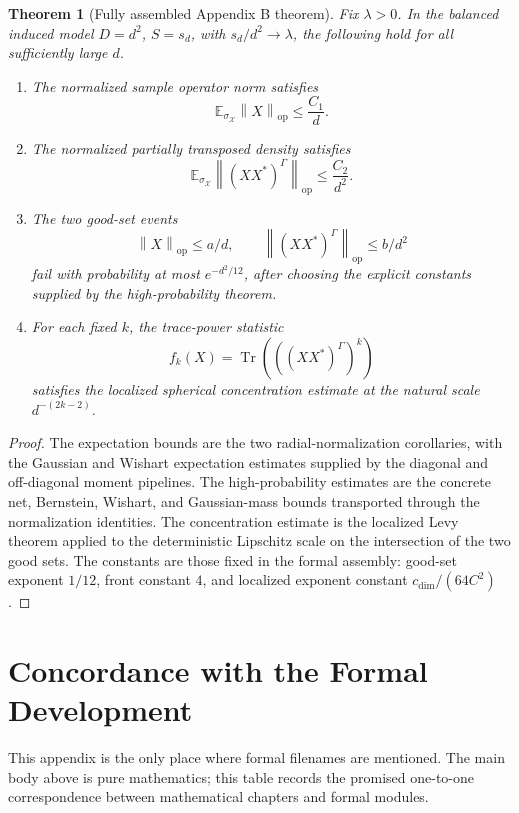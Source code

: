 \documentclass[11pt,oneside]{book}
\newtheorem{theorem}{Theorem}[chapter]
\DeclareMathOperator{\Tr}{Tr}
\newcommand{\E}{\mathbb E}
\newcommand{\1}{\mathbf 1}
\newcommand{\pt}{\Gamma}
\newcommand{\op}{\mathrm{op}}
\newcommand{\norm}[1]{\left\|#1\right\|}
\begin{document}
\begin{theorem}[Fully assembled Appendix B theorem]
Fix \(\lambda>0\).  In the balanced induced model \(D=d^2\), \(S=s_d\), with
\(s_d/d^2\to\lambda\), the following hold for all sufficiently large \(d\).
\begin{enumerate}[label=(\roman*)]
  \item The normalized sample operator norm satisfies
  \[
    \E_{\sigma_{\mathcal X}}\norm X_{\op}\le \frac{C_1}{d}.
  \]
  \item The normalized partially transposed density satisfies
  \[
    \E_{\sigma_{\mathcal X}}\norm{(XX^*)^\pt}_{\op}\le \frac{C_2}{d^2}.
  \]
  \item The two good-set events
  \[
    \norm X_{\op}\le a/d,\qquad
    \norm{(XX^*)^\pt}_{\op}\le b/d^2
  \]
  fail with probability at most \(e^{-d^2/12}\), after choosing the explicit
  constants supplied by the high-probability theorem.
  \item For each fixed \(k\), the trace-power statistic
  \[
    f_k(X)=\Tr\left(\left((XX^*)^\pt\right)^k\right)
  \]
  satisfies the localized spherical concentration estimate at the natural
  scale \(d^{-(2k-2)}\).
\end{enumerate}
\end{theorem}

\begin{proof}
The expectation bounds are the two radial-normalization corollaries, with the
Gaussian and Wishart expectation estimates supplied by the diagonal and
off-diagonal moment pipelines.  The high-probability estimates are the
concrete net, Bernstein, Wishart, and Gaussian-mass bounds transported through
the normalization identities.  The concentration estimate is the localized Levy
theorem applied to the deterministic Lipschitz scale on the intersection of
the two good sets.  The constants are those fixed in the formal assembly:
good-set exponent \(1/12\), front constant \(4\), and localized exponent
constant \(c_{\mathrm{dim}}/(64C^2)\).
\end{proof}

\appendix

\chapter{Concordance with the Formal Development}

This appendix is the only place where formal filenames are mentioned.  The
main body above is pure mathematics; this table records the promised
one-to-one correspondence between mathematical chapters and formal modules.
\end{document}
